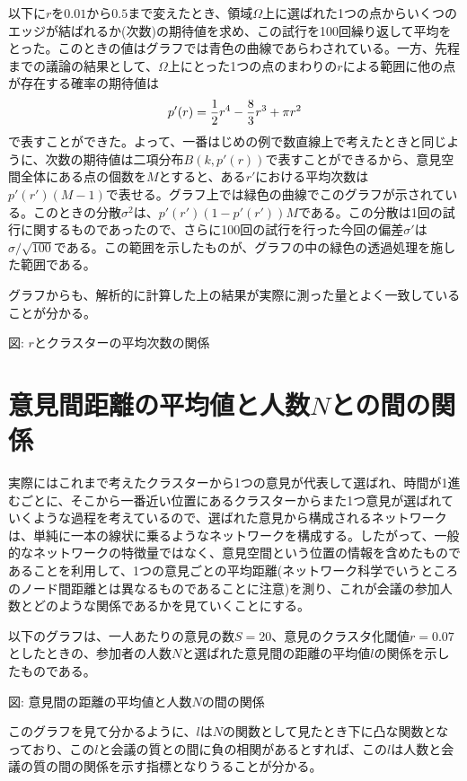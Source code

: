 \documentclass[letterpaper,10pt,english]{sphinxmanual}
\begin{document}
以下に\(r\)を\(0.01\)から\(0.5\)まで変えたとき、領域\(\Omega\)上に選ばれた1つの点からいくつのエッジが結ばれるか(次数)の期待値を求め、この試行を100回繰り返して平均をとった。このときの値はグラフでは青色の曲線であらわされている。一方、先程までの議論の結果として、\(\Omega\)上にとった1つの点のまわりの\(r\)による範囲に他の点が存在する確率の期待値は
\begin{gather}
\begin{split}p'(r) = \frac{1}{2}r^{4} -\frac{8}{3}r^{3} + \pi r^{2}\end{split}\notag
\end{gather}
で表すことができた。よって、一番はじめの例で数直線上で考えたときと同じように、次数の期待値は二項分布\(B(k,p'(r))\)で表すことができるから、意見空間全体にある点の個数を\(M\)とすると、ある\(r'\)における平均次数は\(p'(r')(M-1)\)で表せる。グラフ上では緑色の曲線でこのグラフが示されている。このときの分散\(\sigma^{2}\)は、\(p'(r')(1-p'(r'))M\)である。この分散は1回の試行に関するものであったので、さらに100回の試行を行った今回の偏差\(\sigma'\)は\(\sigma/\sqrt{100}\)である。この範囲を示したものが、グラフの中の緑色の透過処理を施した範囲である。

グラフからも、解析的に計算した上の結果が実際に測った量とよく一致していることが分かる。

図: \(r\)とクラスターの平均次数の関係


\section{意見間距離の平均値と人数\(N\)との間の関係}
\label{draft:id9}
実際にはこれまで考えたクラスターから1つの意見が代表して選ばれ、時間が1進むごとに、そこから一番近い位置にあるクラスターからまた1つ意見が選ばれていくような過程を考えているので、選ばれた意見から構成されるネットワークは、単純に一本の線状に乗るようなネットワークを構成する。したがって、一般的なネットワークの特徴量ではなく、意見空間という位置の情報を含めたものであることを利用して、1つの意見ごとの平均距離(ネットワーク科学でいうところのノード間距離とは異なるものであることに注意)を測り、これが会議の参加人数とどのような関係であるかを見ていくことにする。

以下のグラフは、一人あたりの意見の数\(S=20\)、意見のクラスタ化閾値\(r=0.07\)としたときの、参加者の人数\(N\)と選ばれた意見間の距離の平均値\(l\)の関係を示したものである。

図: 意見間の距離の平均値と人数\(N\)の間の関係

このグラフを見て分かるように、\(l\)は\(N\)の関数として見たとき下に凸な関数となっており、この\(l\)と会議の質との間に負の相関があるとすれば、この\(l\)は人数と会議の質の間の関係を示す指標となりうることが分かる。
\end{document}
